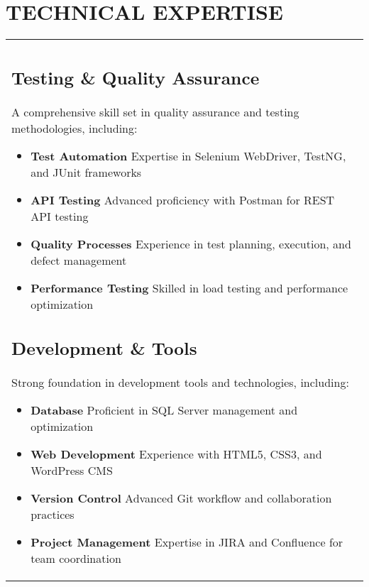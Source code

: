 \documentclass[11pt,a4paper]{article}
\newcommand{\achievement}[2]{\textbf{\textcolor{primary}{#1}} #2}
\begin{document}
\section*{TECHNICAL EXPERTISE}
\begin{tabularx}{\textwidth}{>{\raggedright\arraybackslash}X}
\subsection{Testing \& Quality Assurance}
A comprehensive skill set in quality assurance and testing methodologies, including:
\begin{itemize}[leftmargin=*,nosep,itemsep=4pt]
\item \achievement{Test Automation}{Expertise in Selenium WebDriver, TestNG, and JUnit frameworks}
\item \achievement{API Testing}{Advanced proficiency with Postman for REST API testing}
\item \achievement{Quality Processes}{Experience in test planning, execution, and defect management}
\item \achievement{Performance Testing}{Skilled in load testing and performance optimization}
\end{itemize}

\vspace{0.4cm}
\subsection{Development \& Tools}
Strong foundation in development tools and technologies, including:
\begin{itemize}[leftmargin=*,nosep,itemsep=4pt]
\item \achievement{Database}{Proficient in SQL Server management and optimization}
\item \achievement{Web Development}{Experience with HTML5, CSS3, and WordPress CMS}
\item \achievement{Version Control}{Advanced Git workflow and collaboration practices}
\item \achievement{Project Management}{Expertise in JIRA and Confluence for team coordination}
\end{itemize}
\end{tabularx}
\end{document}
